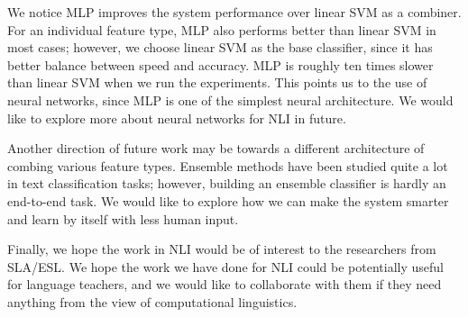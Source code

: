 \documentclass[11pt,letterpaper]{article}
\begin{document}
We notice MLP improves the system performance over linear SVM as a combiner. For an individual feature type, MLP also performs better than linear SVM in most cases; however, we choose linear SVM as the base classifier, since it has better balance between speed and accuracy. MLP is roughly ten times slower than linear SVM when we run the experiments. This points us to the use of neural networks, since MLP is one of the simplest neural architecture. We would like to explore more about neural networks for NLI in future. 

Another direction of future work may be towards a different architecture of combing various feature types. Ensemble methods have been studied quite a lot in text classification tasks; however, building an ensemble classifier is hardly an end-to-end task. We would like to explore how we can make the system smarter and learn by itself with less human input.

Finally, we hope the work in NLI would be of interest to the researchers from SLA/ESL. We hope the work we have done for NLI could be potentially useful for language teachers, and we would like to collaborate with them if they need anything from the view of computational linguistics.
\end{document}
